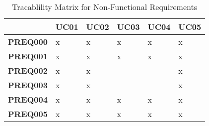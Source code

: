 \begin{comment}
\vspace{5mm}
    
\begin{tabular}{ |p{2cm}||p{9cm}| }
    \hline
    ID & \textbf{PREQ000}\\ \hline
    Category & performance \\ \hline
    Description & 

    \\ \hline
    Rationale &  \\ \hline 
    Source &  \\ \hline
\end{tabular}  
\end{comment}

\begin{flushleft}

\vspace{5mm}

\begin{table}[H]    
    \begin{tabular}{|p{2cm}|p{2cm}|p{2cm}|p{2cm}|p{2cm}|p{2cm}|} 
        \hline & \textbf{UC01} & \textbf{UC02} & \textbf{UC03} & \textbf{UC04} & \textbf{UC05} \\ \hline
        \textbf{PREQ000} & x & x & x & x & x \\ \hline
        \textbf{PREQ001} & x & x & x & x & x \\ \hline
        \textbf{PREQ002} & x & x &  &  & x \\ \hline
        \textbf{PREQ003} & x & x &  &  & x \\ \hline
        \textbf{PREQ004} & x & x & x & x & x \\ \hline
        \textbf{PREQ005} & x & x & x & x & x \\ \hline
    \end{tabular}
    \caption{Tracablility Matrix for Non-Functional Requirements}
\end{table}

\end{flushleft}
